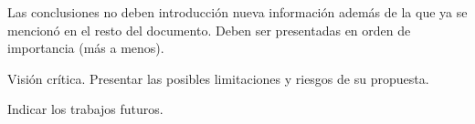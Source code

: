 
Las conclusiones no deben introducción nueva información además de la que ya se mencionó en el resto del documento. Deben ser presentadas en orden de importancia (más a menos).

Visión crítica. Presentar las posibles limitaciones y riesgos de su propuesta.

Indicar los trabajos futuros.
